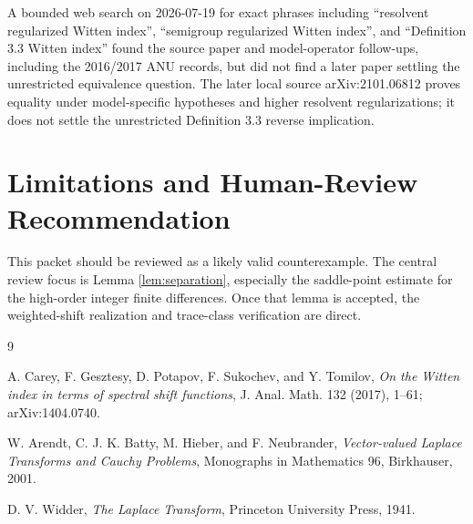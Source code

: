 \documentclass[11pt]{article}
\begin{document}
A bounded web search on 2026-07-19 for exact phrases including ``resolvent
regularized Witten index'', ``semigroup regularized Witten index'', and
``Definition 3.3 Witten index'' found the source paper and model-operator
follow-ups, including the 2016/2017 ANU records, but did not find a later paper
settling the unrestricted equivalence question.  The later local source
arXiv:2101.06812 proves equality under model-specific hypotheses and higher
resolvent regularizations; it does not settle the unrestricted Definition 3.3
reverse implication.

\section*{Limitations and Human-Review Recommendation}

This packet should be reviewed as a likely valid counterexample.  The central
review focus is Lemma \ref{lem:separation}, especially the saddle-point estimate
for the high-order integer finite differences.  Once that lemma is accepted, the
weighted-shift realization and trace-class verification are direct.

\begin{thebibliography}{9}

A. Carey, F. Gesztesy, D. Potapov, F. Sukochev, and Y. Tomilov,
\emph{On the Witten index in terms of spectral shift functions},
J. Anal. Math. 132 (2017), 1--61; arXiv:1404.0740.

W. Arendt, C. J. K. Batty, M. Hieber, and F. Neubrander,
\emph{Vector-valued Laplace Transforms and Cauchy Problems},
Monographs in Mathematics 96, Birkhauser, 2001.

D. V. Widder,
\emph{The Laplace Transform},
Princeton University Press, 1941.

\end{thebibliography}
\end{document}
